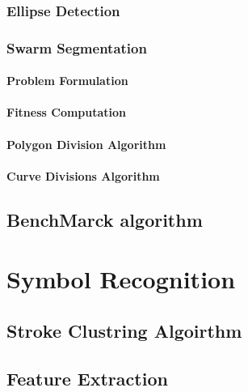 \subsection{Ellipse Detection }
\label{sec:EllipseDetection}


\subsection{Swarm Segmentation}
\label{sec:SwarmSegmentation}
\subsubsection{Problem Formulation }
\label{sec:ProblemFormulation}

\subsubsection{Fitness Computation }
\label{sec:FitnessComputation}
\subsubsection{Polygon Division Algorithm}
\label{sec:PolygonDivisionAlgorithm}

\subsubsection{Curve Divisions Algorithm}
\label{sec:PolygonDivisionAlgorithm}


\section{BenchMarck algorithm}
\label{sec:BenchMarckAlgorithm}


\chapter{Symbol Recognition}
\label{sec:SymbolRecognition}
\section{Stroke Clustring Algoirthm }
\label{sec:ClustringAlgoirthm}
\section{ Feature Extraction}%
\label{sec:FeatureExtraction}









